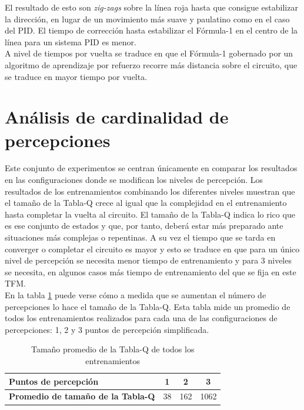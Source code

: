 El resultado de esto son \textit{zig-zags} sobre la línea roja hasta que consigue estabilizar la dirección, en lugar de un movimiento más suave y paulatino como en el caso del PID. El tiempo de corrección hasta estabilizar el Fórmula-1 en el centro de la línea para un sistema PID es menor.\\

A nivel de tiempos por vuelta se traduce en que el Fórmula-1 gobernado por un algoritmo de aprendizaje por refuerzo recorre más distancia sobre el circuito, que se traduce en mayor tiempo por vuelta.


\section{Análisis de cardinalidad de percepciones}

Este conjunto de experimentos se centran únicamente en comparar los resultados en las configuraciones donde se modifican los niveles de percepción. Los resultados de los entrenamientos combinando los diferentes niveles muestran que el tamaño de la Tabla-Q crece al igual que la complejidad en el entrenamiento hasta completar la vuelta al circuito. El tamaño de la Tabla-Q indica lo rico que es ese conjunto de estados y que, por tanto, deberá estar más preparado ante situaciones más complejas o repentinas. A su vez el tiempo que se tarda en converger o completar el circuito es mayor y esto se traduce en que para un único nivel de percepción se necesita menor tiempo de entrenamiento y para 3 niveles se necesita, en algunos casos más tiempo de entrenamiento del que se fija en este TFM.\\

En la tabla \ref{tab:tabla-q-promedio-todos} puede verse cómo a medida que se aumentan el número de percepciones lo hace el tamaño de la Tabla-Q. Esta tabla mide un promedio de todos los entrenamientos realizados para cada una de las configuraciones de percepciones: 1, 2 y 3 puntos de percepción simplificada.

\begin{table}[ht!]
\centering
\begin{tabular}{|l|c|c|c|}
\hline
\rowcolor[HTML]{EFEFEF} 
\textbf{Puntos de percepción}                                     & \textbf{1} & \textbf{2} & \textbf{3} \\ \hline
\cellcolor[HTML]{EFEFEF}\textbf{Promedio de tamaño de la Tabla-Q} & 38         & 162        & 1062       \\ \hline
\end{tabular}
\caption{Tamaño promedio de la Tabla-Q de todos los entrenamientos}
\label{tab:tabla-q-promedio-todos}
\end{table}

